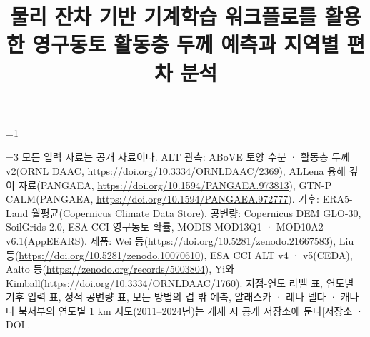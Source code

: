 \providecommand{\frontblock}{0}
\ifnum\frontblock=1
\title[물리 잔차 기반 기계학습의 연도별 활동층 두께 예측]{물리 잔차 기반 기계학습 워크플로를 활용한 영구동토 활동층 두께 예측과 지역별 편차 분석}

\author[1]{}
\author[2]{}
\author[2]{}
\author*[1]{}\email{[교신 저자 전자우편]}


\fi

\ifnum\frontblock=3
모든 입력 자료는 공개 자료이다. ALT 관측: ABoVE 토양 수분 · 활동층 두께 v2(ORNL DAAC, \url{https://doi.org/10.3334/ORNLDAAC/2369}), ALLena 융해 깊이 자료(PANGAEA, \url{https://doi.org/10.1594/PANGAEA.973813}), GTN-P CALM(PANGAEA, \url{https://doi.org/10.1594/PANGAEA.972777}). 기후: ERA5-Land 월평균(Copernicus Climate Data Store). 공변량: Copernicus DEM GLO-30, SoilGrids 2.0, ESA CCI 영구동토 확률, MODIS MOD13Q1 · MOD10A2 v6.1(AppEEARS). 제품: Wei 등(\url{https://doi.org/10.5281/zenodo.21667583}), Liu 등(\url{https://doi.org/10.5281/zenodo.10070610}), ESA CCI ALT v4 · v5(CEDA), Aalto 등(\url{https://zenodo.org/records/5003804}), Yi와 Kimball(\url{https://doi.org/10.3334/ORNLDAAC/1760}). 지점-연도 라벨 표, 연도별 기후 입력 표, 정적 공변량 표, 모든 방법의 겹 밖 예측, 알래스카 · 레나 델타 · 캐나다 북서부의 연도별 1 km 지도(2011--2024년)는 게재 시 공개 저장소에 둔다[저장소 · DOI].
\fi

